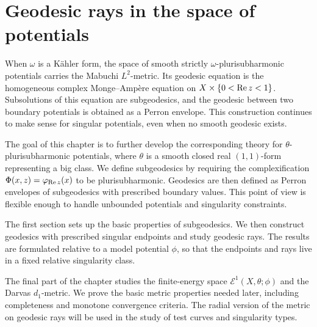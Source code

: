 \chapter{Geodesic rays in the space of potentials}
\label{chap:rays}

When $\omega$ is a K\"ahler form, the space of smooth strictly $\omega$-plurisubharmonic potentials carries the Mabuchi $L^2$-metric. Its geodesic equation is the homogeneous complex Monge--Amp\`ere equation on $X\times\{0<\operatorname{Re} z<1\}$. Subsolutions of this equation are subgeodesics, and the geodesic between two boundary potentials is obtained as a Perron envelope. This construction continues to make sense for singular potentials, even when no smooth geodesic exists.

The goal of this chapter is to further develop the corresponding theory for $\theta$-plurisubharmonic potentials, where $\theta$ is a smooth closed real $(1,1)$-form representing a big class. We define subgeodesics by requiring the complexification $\Phi(x,z)=\varphi_{\operatorname{Re} z}(x)$ to be plurisubharmonic. Geodesics are then defined as Perron envelopes of subgeodesics with prescribed boundary values. This point of view is flexible enough to handle unbounded potentials and singularity constraints.

The first section sets up the basic properties of subgeodesics. We then construct geodesics with prescribed singular endpoints and study geodesic rays. The results are formulated relative to a model potential $\phi$, so that the endpoints and rays live in a fixed relative singularity class.

The final part of the chapter studies the finite-energy space $\mathcal E^1(X,\theta;\phi)$ and the Darvas $d_1$-metric. We prove the basic metric properties needed later, including completeness and monotone convergence criteria. The radial version of the metric on geodesic rays will be used in the study of test curves and singularity types.

